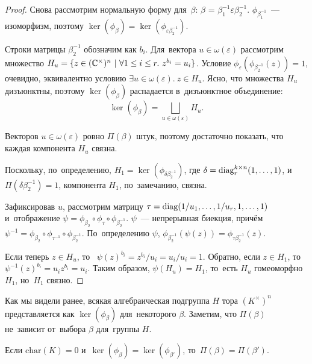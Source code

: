\documentclass[a4paper,oneside]{article}
\begin{document}
\begin{proof}
  Снова рассмотрим нормальную форму для~$\beta$: $\beta$ = $\beta_1^{-1} \varepsilon \beta_2^{-1}$.
  $\phi_{\beta_1^{-1}}$~— изоморфизм, поэтому $\ker(\phi_{\beta}) = \ker(\phi_{\varepsilon \beta_2^{-1}})$.

  Строки матрицы $\beta_2^{-1}$ обозначим как $b_i$.
  Для~вектора $u \in \omega(\varepsilon)$ рассмотрим множество $H_u = \{z \in (\mathbb{C}^\times)^n \ | \ \forall 1 \leq i \leq r.\ z^{b_i} = u_i\}$.
  Условие $\phi_\varepsilon(\phi_{\beta_2^{-1}}(z)) = 1$, очевидно, эквивалентно условию $\exists u \in \omega(\varepsilon).\ z \in H_u$.
  Ясно, что множества $H_u$ дизъюнктны, поэтому $\ker(\phi_{\beta})$ распадается в~дизъюнктное объединение:
  \[
    \ker(\phi_{\beta}) = \bigsqcup_{u \in \omega(\varepsilon)} H_u.
  \]

  Векторов $u \in \omega(\varepsilon)$ ровно $\Pi(\beta)$ штук, поэтому достаточно показать, что каждая компонента $H_u$ связна.

  Поскольку, по~определению, $H_1 = \ker(\phi_{\delta \beta_2^{-1}})$, где $\delta = \mathrm{diag}^{k \times n}_r(1, \ldots, 1)$,
  и~$\Pi(\delta \beta_2^{-1}) = 1$, компонента $H_1$, по~замечанию, связна.

  Зафиксировав $u$, рассмотрим матрицу $\tau = \mathrm{diag}(1 / u_1, \ldots, 1 / u_r, 1, \ldots, 1)$ и~отображение $\psi = \phi_{\beta_2} \circ \phi_\tau \circ \phi_{\beta_2^{-1}}$.
  $\psi$~— непрерывная биекция, причём $\psi^{-1} = \phi_{\beta_2} \circ \phi_{\tau^{-1}} \circ \phi_{\beta_2^{-1}}$.
  По~определению $\psi$, $\phi_{\beta_2^{-1}}(\psi(z)) = \phi_{\tau \beta_2^{-1}}(z)$.

  Если теперь $z \in H_u$, то~ $\psi(z)^{b_i} = z^{b_i} / u_i = u_i / u_i = 1$. Обратно, если $z \in H_1$,
  то~$\psi^{-1}(z)^{b_i} = u_i z^{b_i} = u_i$. Таким образом, $\psi(H_u) = H_1$,
  то~есть $H_u$ гомеоморфно $H_1$, но~$H_1$ связно.
\end{proof}

Как мы видели ранее, всякая алгебраическая подгруппа $H$ тора $(K^\times)^n$ представляется как $\ker(\phi_\beta)$
для~некоторого $\beta$. Заметим, что $\Pi(\beta)$ не~зависит от~выбора $\beta$ для~группы $H$.

\begin{theorem}
  Если $\mathrm{char}(K) = 0$ и~$\ker(\phi_{\beta}) = \ker(\phi_{\beta'})$, то~$\Pi(\beta) = \Pi(\beta')$.
\end{theorem}
\end{document}

